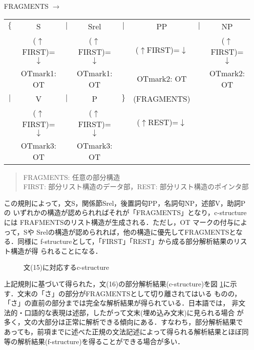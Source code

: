 \begin{table}[htbp]
\quad FRAGMENTS \qquad $\longrightarrow$ 
\begin{center}
\begin{tabular}{cccccccc}
$\{$&S&$|$&Srel&$|$&PP&$|$&NP\\
&\footnotesize{($\uparrow$FIRST)=$\downarrow$} && \footnotesize{($\uparrow$FIRST)=$\downarrow$} && \footnotesize{($\uparrow$FIRST)=$\downarrow$} && \footnotesize{($\uparrow$FIRST)=$\downarrow$}\\
\vspace{2mm}
&\footnotesize{OTmark1: OT}&&\footnotesize{OTmark1: OT} && \footnotesize{OTmark2: OT} && \footnotesize{OTmark2: OT}  \\
$|$&V&$|$&P&$\}$&(FRAGMENTS)&&\\
& \footnotesize{($\uparrow$FIRST)=$\downarrow$} && \footnotesize{($\uparrow$FIRST)=$\downarrow$} && \footnotesize{($\uparrow$REST)=$\downarrow$}&&\\
&\footnotesize{OTmark3: OT} && \footnotesize{OTmark3: OT}&&&&\\
\end{tabular}
\end{center}
\begin{quote}
FRAGMENTS: 任意の部分構造\\
FIRST: 部分リスト構造のデータ部，REST: 部分リスト構造のポインタ部
\end{quote}
\end{table}

\vspace{6mm}
この規則によって，文S，関係節Srel，後置詞句PP，名詞句NP，述部V，助詞Pの
いずれかの構造が認められればそれが「FRAGMENTS」となり，c-structureには
FRAFMENTSのリスト構造が生成される．ただし，OT マークの付与によって，Sや
Srelの構造が認められれば，他の構造に優先してFRAGMENTSとなる．同様に
f-structureとして，「FIRST」「REST」から成る部分解析結果のリスト構造が得
られることになる．

\begin{figure}[htb]
\center
\epsfxsize=89.11mm
\caption{文(15)に対応するc-structure}
\label{fig4-9}
\end{figure}

上記規則に基づいて得られた，文(16)の部分解析結果(c-structure)を図
\ref{fig4-9}に示す．文末の「さ」の部分がFRAGMENTSとして切り離されてはいる
ものの，「さ」の直前の部分までは完全な解析結果が得られている．日本語では，
非文法的・口語的な表現は述部，したがって文末(埋め込み文末)に見られる場合
が多く，文の大部分は正常に解析できる傾向にある．すなわち，部分解析結果で
あっても，前項までに述べた正規の文法記述によって得られる解析結果とほぼ同
等の解析結果(f-structure)を得ることができる場合が多い．


